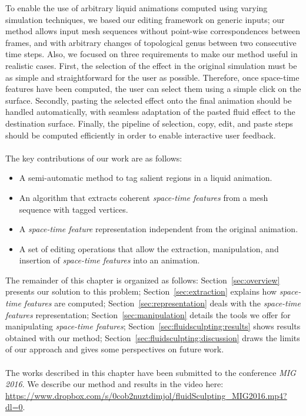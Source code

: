 To enable the use of arbitrary liquid animations computed using varying simulation techniques, we based our editing framework on generic inputs; 
our method allows input mesh sequences without point-wise correspondences between frames, and with arbitrary changes of topological genus between two consecutive time steps.
Also, we focused on three requirements to make our method useful in realistic cases.
First, the selection of the effect in the original simulation must be as simple and straightforward for the user as possible. 
Therefore, once space-time features have been computed, the user can select them using a simple click on the surface.
Secondly, pasting the selected effect onto the final animation should be handled automatically, with seamless adaptation of the pasted fluid effect to the destination surface. 
Finally, the pipeline of selection, copy, edit, and paste steps should be computed efficiently in order to enable interactive user feedback. 
\paragraph*{}
The key contributions of our work are as follows:
\begin{itemize}
    \item A semi-automatic method to tag salient regions in a liquid animation.
    \item An algorithm that extracts coherent \emph{space-time features} from a mesh sequence with tagged vertices.
    \item A \emph{space-time feature} representation independent from the original animation.
    \item A set of editing operations that allow the extraction, manipulation, and insertion of \emph{space-time features} into an animation.
\end{itemize}
The remainder of this chapter is organized as follows:
Section~\ref{sec:overview} presents our solution to this problem;
Section~\ref{sec:extraction} explains how \emph{space-time features} are computed; 
Section~\ref{sec:representation} deals with the \emph{space-time features} representation; 
Section~\ref{sec:manipulation} details the tools we offer for manipulating \emph{space-time features}; 
Section~\ref{sec:fluidsculpting:results} shows results obtained with our method; 
Section~\ref{sec:fluidsculpting:discussion} draws the limits of our approach and gives some perspectives on future work.
\paragraph*{}
The works described in this chapter have been submitted to the conference \emph{MIG 2016}. We describe our method and results in the video here: \url{https://www.dropbox.com/s/0cob2nuztdimjol/fluidSculpting_MIG2016.mp4?dl=0}.

